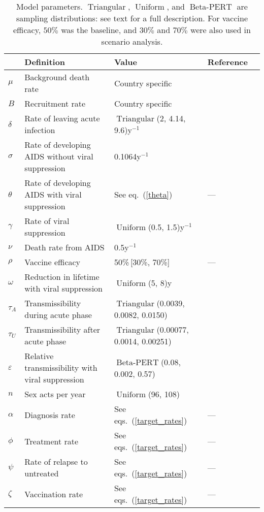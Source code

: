 \documentclass[11pt]{article}
\DeclareMathOperator{\Uniform}{Uniform}
\DeclareMathOperator{\Triangular}{Triangular}
\DeclareMathOperator{\BetaPERT}{Beta-PERT}
\begin{document}
\begin{table}
  \begin{center}
    \begin{tabularx}{\textwidth}{lXlll}
      \hline
      & Definition & Value & Reference \\
      \hline
      $\mu$ & Background death rate & Country specific
      & \cite{World_Development_Indicators2013-ee} \\
      $B$ & Recruitment rate & Country specific
      & \cite{World_Development_Indicators2013-ee, WorldBankpg} \\
      $\delta$	& Rate of leaving acute infection
      & $\Triangular$(2, 4.14, 9.6)\;y$^{-1}$
      & \cite{Hollingsworth2008-iy} \\
      $\sigma$	& Rate of developing AIDS without viral suppression
      & 0.1064\;y$^{-1}$ & \cite{Morgan2002-cq} \\
      $\theta$ & Rate of developing AIDS with viral suppression
      & See eq.~(\ref{theta}) & --- \\
      $\gamma$ & Rate of viral suppression
      & $\Uniform$(0.5, 1.5)\;y$^{-1}$
      & \cite{Currie2009-yz} \\
      $\nu$ & Death rate from AIDS & 0.5\;y$^{-1}$
      & \cite{Morgan2002-cq} \\
      $\rho$ & Vaccine efficacy & 50\%\,[30\%, 70\%] & --- \\
      $\omega$	& Reduction in lifetime with viral suppression
      & $\Uniform$(5, 8)\;y
      & \cite{Unaids2014-ue, Samji2013-kf} \\
      $\tau_{A}$ & Transmissibility during acute phase
      & $\Triangular$(0.0039, 0.0082, 0.0150)
      & \cite{Skarbinski2015-ni,Wawer2005-us}\\
      $\tau_{U}$ & Transmissibility after acute phase
      & $\Triangular$(0.00077, 0.0014, 0.00251)
      & \cite{Hughes2012-so} \\
      $\varepsilon$ & Relative transmissibility with
      viral suppression & $\BetaPERT$(0.08, 0.002, 0.57)
      & \cite{Donnell2010-xo} \\
      $n$ & Sex acts per year & $\Uniform$(96, 108)
      & \cite{Wawer2005-us,Abdool_Karim2010-cm}\\
      $\alpha$ & Diagnosis rate & See eqs.~(\ref{target_rates}) & --- \\
      $\phi$ & Treatment rate & See eqs.~(\ref{target_rates}) & --- \\
      $\psi$ & Rate of relapse to untreated & See eqs.~(\ref{target_rates})
      & --- \\
      $\zeta$ & Vaccination rate & See eqs.~(\ref{target_rates}) & --- \\
      \hline
    \end{tabularx}
    \caption{Model parameters. $\Triangular$, $\Uniform$,
      and $\BetaPERT$ are sampling distributions: see text for a
      full description.  For vaccine efficacy, $50\%$ was the
      baseline, and $30\%$ and $70\%$ were also used in scenario
      analysis.}
    \label{model_param}
  \end{center}
\end{table}
\end{document}
